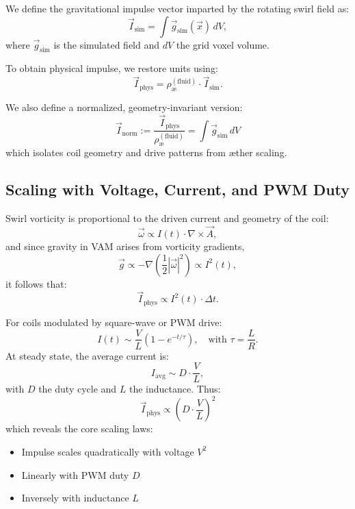 \documentclass[twocolumn,aps,pre,floatfix,nofootinbib]{revtex4-2}
\begin{document}
We define the gravitational impulse vector imparted by the rotating swirl field as:
\begin{equation}
    \vec{I}_\text{sim} = \int \vec{g}_\text{sim}(\vec{x}) \, dV,
\end{equation}
where \( \vec{g}_\text{sim} \) is the simulated field and \( dV \) the grid voxel volume.

To obtain physical impulse, we restore units using:
\begin{equation}
    \vec{I}_\text{phys} = \rho_\text{\ae}^{(\text{fluid})} \cdot \vec{I}_\text{sim}.
\end{equation}

We also define a normalized, geometry-invariant version:
\begin{equation}
    \boxed{ \vec{I}_\text{norm} := \frac{\vec{I}_\text{phys}}{\rho_\text{\ae}^{(\text{fluid})}} = \int \vec{g}_\text{sim} \, dV }
\end{equation}
which isolates coil geometry and drive patterns from æther scaling.

\subsection*{Scaling with Voltage, Current, and PWM Duty}

Swirl vorticity is proportional to the driven current and geometry of the coil:
\[
    \vec{\omega} \propto I(t) \cdot \nabla \times \vec{A},
\]
and since gravity in VAM arises from vorticity gradients,
\[
    \vec{g} \propto -\nabla \left( \frac{1}{2} |\vec{\omega}|^2 \right) \propto I^2(t),
\]
it follows that:
\begin{equation}
    \vec{I}_\text{phys} \propto I^2(t) \cdot \Delta t.
\end{equation}

For coils modulated by square-wave or PWM drive:
\[
    I(t) \sim \frac{V}{L} (1 - e^{-t/\tau}), \quad \text{with } \tau = \frac{L}{R}.
\]
At steady state, the average current is:
\[
    I_\text{avg} \sim D \cdot \frac{V}{L},
\]
with \( D \) the duty cycle and \( L \) the inductance. Thus:
\begin{equation}
    \boxed{ \vec{I}_\text{phys} \propto \left( D \cdot \frac{V}{L} \right)^2 }
\end{equation}
which reveals the core scaling laws:
\begin{itemize}
    \item Impulse scales quadratically with voltage \( V^2 \)
    \item Linearly with PWM duty \( D \)
    \item Inversely with inductance \( L \)
\end{itemize}
\end{document}
